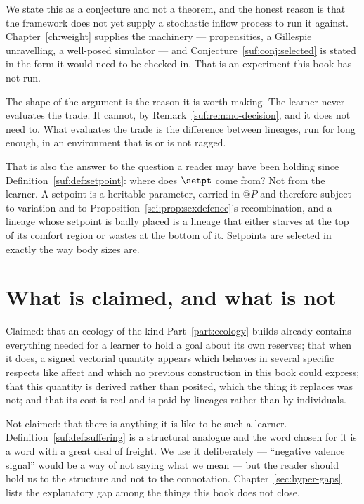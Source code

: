 We state this as a conjecture and not a theorem, and the honest reason is
that the framework does not yet supply a stochastic inflow process to run
it against.
Chapter~\ref{ch:weight} supplies the machinery --- propensities, a
Gillespie unravelling, a well-posed simulator --- and
Conjecture~\ref{suf:conj:selected} is stated in the form it would need
to be checked in.
That is an experiment this book has not run.

\begin{remark}
\label{suf:rem:nobody-chose}
The shape of the argument is the reason it is worth making.
The learner never evaluates the trade.
It cannot, by Remark~\ref{suf:rem:no-decision}, and it does not need to.
What evaluates the trade is the difference between lineages, run for long
enough, in an environment that is or is not ragged.

That is also the answer to the question a reader may have been holding
since Definition~\ref{suf:def:setpoint}: where does $\setpt$ come from?
Not from the learner.
A setpoint is a heritable parameter, carried in $@P$ and therefore subject
to variation and to Proposition~\ref{sci:prop:sexdefence}'s recombination,
and a lineage whose setpoint is badly placed is a lineage that either
starves at the top of its comfort region or wastes at the bottom of it.
Setpoints are selected in exactly the way body sizes are.
\end{remark}

\section{What is claimed, and what is not}
\label{suf:S6}

Claimed: that an ecology of the kind Part~\ref{part:ecology} builds
already contains everything needed for a learner to hold a goal about its
own reserves; that when it does, a signed vectorial quantity appears
which behaves in several specific respects like affect and which no
previous construction in this book could express; that this quantity is
derived rather than posited, which the thing it replaces was not; and
that its cost is real and is paid by lineages rather than by individuals.

Not claimed: that there is anything it is like to be such a learner.
Definition~\ref{suf:def:suffering} is a structural analogue and the word
chosen for it is a word with a great deal of freight.
We use it deliberately --- ``negative valence signal'' would be a way of
not saying what we mean --- but the reader should hold us to the
structure and not to the connotation.
Chapter~\ref{sec:hyper-gaps} lists the explanatory gap among the things
this book does not close.

